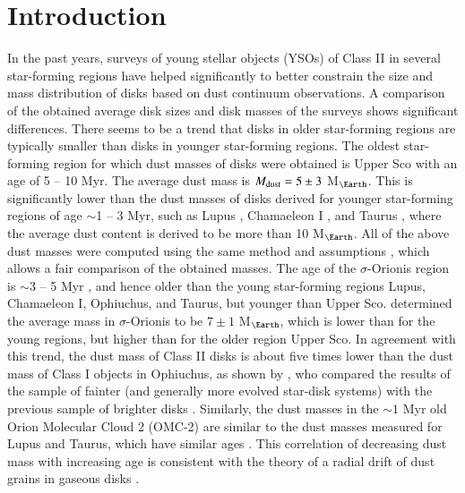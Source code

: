 \documentclass{aa}
\begin{document}

   \maketitle
   
\section{Introduction}

In the past years, surveys of young stellar objects (YSOs) of Class II in several star-forming regions have helped significantly to better constrain the size and mass distribution of disks based on dust continuum observations.
A comparison of the obtained average disk sizes and disk masses of the surveys shows significant differences. 
There seems to be a trend that disks in older star-forming regions are typically smaller than disks in younger star-forming regions. 
The oldest star-forming region for which dust masses of disks were obtained is Upper Sco \citep{Barenfeld2016} with an age of 5 -- 10 Myr. 
The average dust mass is $M_{\rm dust} = 5\pm3$ M$_{\Earth}$.
This is significantly lower than the dust masses of disks derived for younger star-forming regions of age $\sim$1 -- 3 Myr, such as Lupus \citep{Ansdell2016}, Chamaeleon I \citep{Pascucci2016}, and Taurus \citep{Long2018}, where the average dust content is derived to be more than 10 M$_{\Earth}$. 
All of the above dust masses were computed using the same method and assumptions \citep[see table 4 in][]{Cazzoletti2019}, which allows a fair comparison of the obtained masses.
The age of the $\sigma$-Orionis region is $\sim$3 -- 5 Myr \citep{Oliveira2002,Oliveira2004}, and hence older than the young star-forming regions Lupus, Chamaeleon I, Ophiuchus, and Taurus, but younger than Upper Sco.
\citet{Ansdell2017} determined the average mass in $\sigma$-Orionis to be $7\pm1$ M$_{\Earth}$, which is lower than for the young regions, but higher than for the older region Upper Sco. 
In agreement with this trend, the dust mass of Class II disks is about five times lower than the dust mass of Class I objects in Ophiuchus, as shown by \citet{Williams2019}, who compared the results of the sample of fainter (and generally more evolved star-disk systems) with the previous sample of brighter disks \citep{Cieza2019}.
Similarly, the dust masses in the $\sim 1$ Myr old Orion Molecular Cloud 2 (OMC-2) are similar to the dust masses measured for Lupus and Taurus, which have similar ages \citep{vanTerwisga2019}.
This correlation of decreasing dust mass with increasing age is consistent with the theory of a radial drift of dust grains in gaseous disks \citep{Whipple1972, Weidenschilling1977,Birnstiel2010}. 
\end{document}

